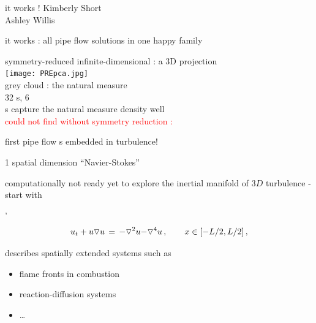 \begin{frame}{it works !}
Kimberly Short
\\
Ashley Willis
\end{frame}

\begin{frame}{it works : all pipe flow solutions in one happy family}
\begin{block}{}
symmetry-reduced infinite-dimensional {\slice} : a 3D projection
\\
   {\hfill
      \texttt{[image: PREpca.jpg]} %
      \qquad
   }
   \\
grey cloud : the natural measure
\\
  32 \rpo s,  6 \reqva
\\
\po s capture the
natural measure density  well
\\\hfill
\textcolor{red}{could not find without symmetry reduction :}
\end{block}

\bigskip
first pipe flow \rpo s embedded in turbulence!
\end{frame}

\begin{frame}{1 spatial dimension ``Navier-Stokes''}

computationally not ready yet to explore the inertial manifold of $3D$
turbulence - start with

\bigskip

\begin{block}{\KSe'}
\[
  u_t + u \triangledown u \,=\,
    {\color{red}-}\triangledown^2 u {\color{red}-\triangledown^4 u}
    \,,\qquad   x \in [-L/2,L/2]
    \,,
\]
\end{block}

\bigskip

describes spatially extended systems such as
\begin{itemize}
 \item flame fronts in combustion
 \item reaction-diffusion systems
 \item \ldots
\end{itemize}

\end{frame}

